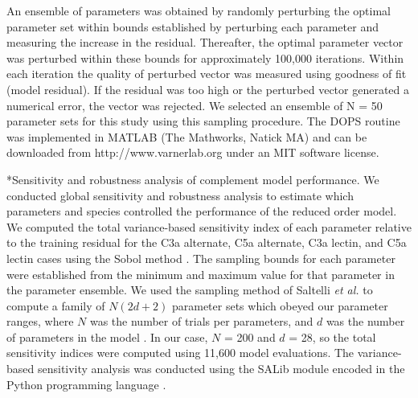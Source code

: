 \documentclass[12pt]{article}
\makeatletter
\renewcommand\subsection{\@startsection
	{subsection}{2}{0mm}
	{-0.05in}
	{-0.5\baselineskip}
	{\normalfont\normalsize\bfseries}}
\makeatother
\begin{document}
An ensemble of parameters was obtained by randomly perturbing the optimal parameter set within bounds established by perturbing each parameter and measuring the increase in the residual.
Thereafter, the optimal parameter vector was perturbed within these bounds for approximately 100,000 iterations.
Within each iteration the quality of perturbed vector was measured using goodness of fit (model residual).
If the residual was too high or the perturbed vector generated a numerical error, the vector was rejected.
We selected an ensemble of N = 50 parameter sets for this study using this sampling procedure.
The DOPS routine was implemented in MATLAB (The Mathworks, Natick MA) and can be downloaded from http://www.varnerlab.org under an MIT software license.


\subsection*{Sensitivity and robustness analysis of complement model performance.}
We conducted global sensitivity and robustness analysis to estimate which parameters and species controlled the performance of the reduced order model.
We computed the total variance-based sensitivity index of each parameter relative to the training residual for the C3a alternate, C5a alternate, C3a lectin, and C5a lectin cases using the Sobol method \cite{SOBOL_METHOD}.
The sampling bounds for each parameter were established from the minimum and maximum value for that parameter in the parameter ensemble.
We used the sampling method of Saltelli \textit{et al.} to compute a family of $N\left(2d+2\right)$ parameter sets which obeyed our parameter ranges,
where $N$ was the number of trials per parameters, and $d$ was the number of parameters in the model \cite{saltelli2010variance}.
In our case, $N$ = 200 and $d$ = 28, so the total sensitivity indices were computed using 11,600 model evaluations.
The variance-based sensitivity analysis was conducted using the SALib module encoded in the Python programming language \cite{SALIB}.
\end{document}
